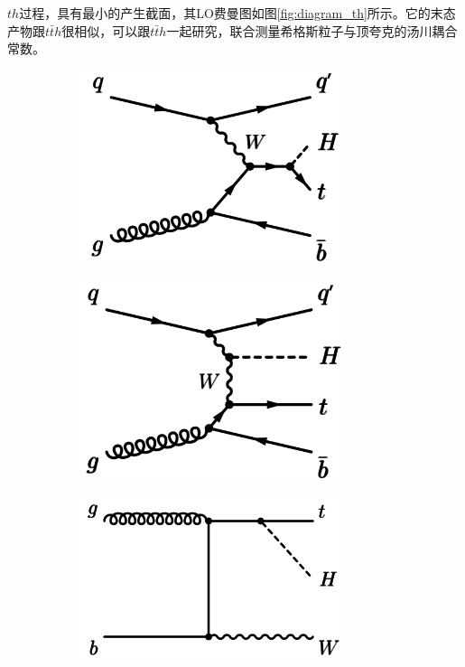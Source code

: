 $th$过程，具有最小的产生截面，其LO费曼图如图\ref{fig:diagram_th}所示。它的末态产物跟$t\bar{t}h$很相似，可以跟$t\bar{t}h$一起研究，联合测量希格斯粒子与顶夸克的汤川耦合常数。
\begin{figure}[h]
\centering
 \begin{subfigure}[b]{0.33\textwidth}
  \includegraphics[width=0.85\textwidth]{fig/diagram_thqb1.png}
  \caption{}
  \label{fig:diagram_VH}
 \end{subfigure}
 \begin{subfigure}[b]{0.33\textwidth}
  \includegraphics[width=0.85\textwidth]{fig/diagram_thqb2.png}
  \caption{}
  \label{fig:diagram_ggzh1}
 \end{subfigure}
 \begin{subfigure}[b]{0.33\textwidth}
  \includegraphics[width=0.85\textwidth]{fig/diagram_thW1.png}

\end{subfigure}
\end{figure}
